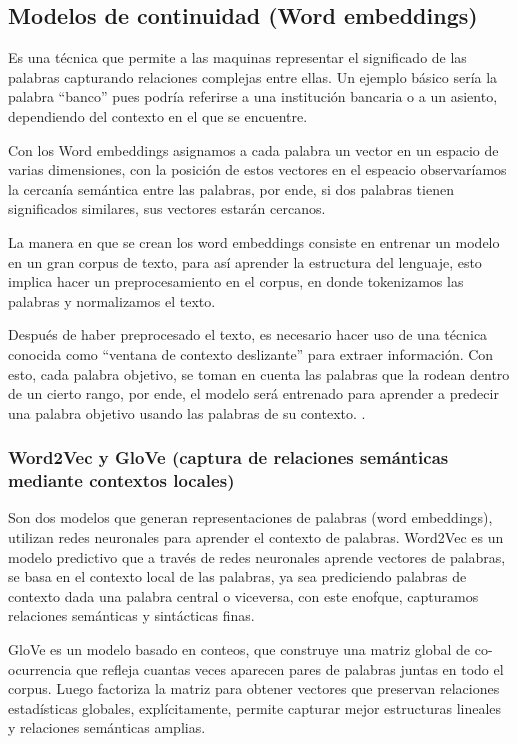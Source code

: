 \subsection{Modelos de continuidad (Word embeddings)}

Es una técnica que permite a las maquinas representar el significado de las palabras capturando relaciones complejas entre ellas. Un ejemplo básico sería la palabra “banco” pues podría referirse a una institución bancaria o a un asiento, dependiendo del contexto en el que se encuentre.

Con los Word embeddings asignamos a cada palabra un vector en un espacio de varias dimensiones, con la posición de estos vectores en el espeacio observaríamos la cercanía semántica entre las palabras, por ende, si dos palabras tienen significados similares, sus vectores estarán cercanos.
 
La manera en que se crean los word embeddings consiste en entrenar un modelo en un gran corpus de texto, para así aprender la estructura del lenguaje, esto implica hacer un preprocesamiento en el corpus, en donde tokenizamos las palabras y normalizamos el texto.

Después de haber preprocesado el texto, es necesario hacer uso de una técnica conocida como “ventana de contexto deslizante” para extraer información. Con esto, cada palabra objetivo, se toman en cuenta las palabras que la rodean dentro de un cierto rango, por ende, el modelo será entrenado para aprender a predecir una palabra objetivo usando las palabras de su contexto.
.

\subsubsection{Word2Vec y GloVe (captura de relaciones semánticas mediante contextos locales)}

Son dos modelos que generan representaciones de palabras (word embeddings), utilizan redes neuronales para aprender el contexto de palabras.
Word2Vec es un modelo predictivo que a través de redes neuronales aprende vectores de palabras, se basa en el contexto local de las palabras, ya sea prediciendo palabras de contexto dada una palabra central o viceversa, con este enofque, capturamos relaciones semánticas y sintácticas finas.

GloVe es un modelo basado en conteos, que construye una matriz global de co-ocurrencia que refleja cuantas veces aparecen pares de palabras juntas en todo el corpus. Luego factoriza la matriz para obtener vectores que preservan relaciones estadísticas globales, explícitamente, permite capturar mejor estructuras lineales y relaciones semánticas amplias.

